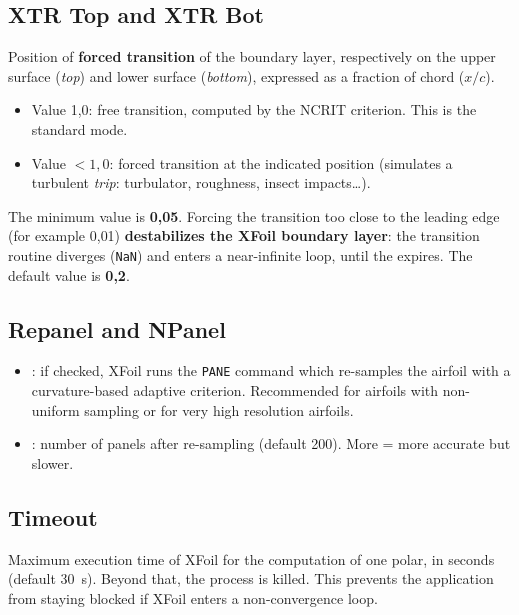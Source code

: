 \subsection{XTR Top and XTR Bot}

Position of \textbf{forced transition} of the boundary layer,
respectively on the upper surface (\emph{top}) and lower surface
(\emph{bottom}), expressed as a fraction of chord ($x/c$).

\begin{itemize}
    \item Value 1{,}0: free transition, computed by the
        NCRIT criterion. This is the standard mode.
    \item Value $<1{,}0$: forced transition at the indicated position
        (simulates a turbulent \emph{trip}: turbulator, roughness,
        insect impacts\dots).
\end{itemize}

\begin{important}
The minimum value is \textbf{0{,}05}. Forcing the transition too
close to the leading edge (for example 0{,}01) \textbf{destabilizes
the XFoil boundary layer}: the transition routine diverges
(\texttt{NaN}) and enters a near-infinite loop, until the
 expires. The default value is
\textbf{0{,}2}.
\end{important}

\subsection{Repanel and NPanel}

\begin{itemize}
    \item {}: if checked, XFoil runs the
        \texttt{PANE} command which re-samples the airfoil with a
        curvature-based adaptive criterion. Recommended for
        airfoils with non-uniform sampling or for
        very high resolution airfoils.
    \item {}: number of panels after re-sampling
        (default 200). More = more accurate but slower.
\end{itemize}

\subsection{Timeout}

Maximum execution time of XFoil for the computation of one polar,
in seconds (default 30~s). Beyond that, the process is killed.
This prevents the application from staying blocked if XFoil enters
a non-convergence loop.

